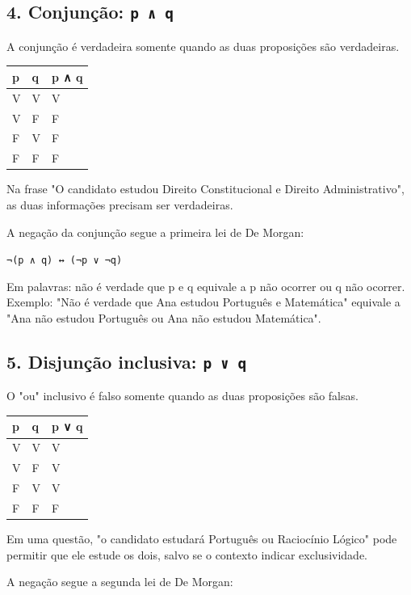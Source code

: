 \documentclass[11pt,a4paper]{article}
\begin{document}
\subsection*{4. Conjunção: \texttt{p ∧ q}}

A conjunção é verdadeira somente quando as duas proposições são verdadeiras.

\begin{tabularx}{\linewidth}{llX}
\toprule
 \textbf{p} & \textbf{q} & \textbf{p ∧ q} \\
\midrule
 V & V & V \\
 V & F & F \\
 F & V & F \\
 F & F & F \\
\bottomrule
\end{tabularx}


Na frase "O candidato estudou Direito Constitucional e Direito Administrativo", as duas informações precisam ser verdadeiras.

A negação da conjunção segue a primeira lei de De Morgan:

\texttt{¬(p ∧ q) ↔ (¬p ∨ ¬q)}

Em palavras: não é verdade que p e q equivale a p não ocorrer ou q não ocorrer. Exemplo: "Não é verdade que Ana estudou Português e Matemática" equivale a "Ana não estudou Português ou Ana não estudou Matemática".

\subsection*{5. Disjunção inclusiva: \texttt{p ∨ q}}

O "ou" inclusivo é falso somente quando as duas proposições são falsas.

\begin{tabularx}{\linewidth}{llX}
\toprule
 \textbf{p} & \textbf{q} & \textbf{p ∨ q} \\
\midrule
 V & V & V \\
 V & F & V \\
 F & V & V \\
 F & F & F \\
\bottomrule
\end{tabularx}


Em uma questão, "o candidato estudará Português ou Raciocínio Lógico" pode permitir que ele estude os dois, salvo se o contexto indicar exclusividade.

A negação segue a segunda lei de De Morgan:
\end{document}

